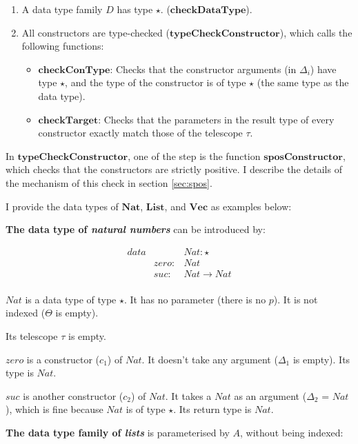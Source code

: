 \documentclass[acmsmall]{acmart}
\begin{document}
\begin{enumerate}
  \item A data type family $D$ has type $\star$. ($\boldsymbol{checkDataType}$).
  \item All constructors are type-checked ($\boldsymbol{typeCheckConstructor}$), which calls the following functions:
        \begin{itemize}
          \item  $\boldsymbol{checkConType}$: Checks that the constructor arguments (in $\Delta_i$) have type $\star$, and the type of the constructor is of type $\star$ (the same type as the data type).
          \item  $\boldsymbol{checkTarget}$: Checks that the parameters in the result type of every constructor exactly match those of the telescope $\tau$.
        \end{itemize}
\end{enumerate}
In $\boldsymbol{typeCheckConstructor}$, one of the step is the function $\boldsymbol{sposConstructor}$, which checks that the constructors are strictly positive. I describe the details of the mechanism of this check in section \ref{sec:spos}.

I provide the data types of $\boldsymbol{Nat}$, $\boldsymbol{List}$, and $\boldsymbol{Vec}$ as examples below:

\textbf{The data type of \emph{natural numbers}} can be introduced by:

\begin{equation*}
  \begin{aligned}
    data &       & Nat : \star \\
         & zero: & Nat         \\
         & suc:  & Nat \to Nat \\
  \end{aligned}
\end{equation*}

$Nat$ is a data type of type $\star$. It has no parameter (there is no $p$). It is not indexed ($\Theta$ is empty).

Its telescope $\tau$ is empty.

$zero$ is a constructor ($c_1$) of $Nat$. It doesn't take any argument ($\Delta_1$ is empty). Its type is $Nat$. 

$suc$ is another constructor ($c_2$) of $Nat$. It takes a $Nat$ as an argument ($\Delta_2$ = $Nat$), which is fine because $Nat$ is of type $\star$. Its return type is $Nat$.

\textbf{The data type family of \emph{lists}} is parameterised by $A$, without being indexed:
\end{document}
